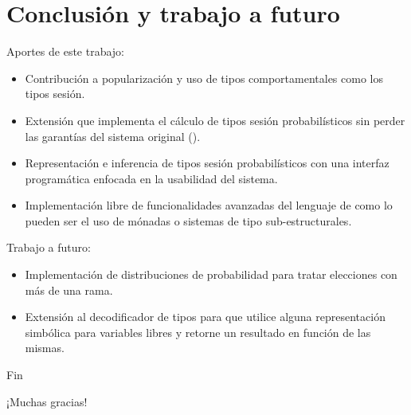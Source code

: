 \section{Conclusión y trabajo a futuro}
\begin{frame}{\insertsection}
	Aportes de este trabajo:
	\begin{itemize}
		\item Contribución a popularización y uso de tipos comportamentales como los
			tipos sesión.
		\item Extensión que implementa el cálculo de tipos sesión
			probabilísticos sin perder las garantías del sistema
			original (\FuSe).
		\item Representación e inferencia de tipos sesión
			probabilísticos con una interfaz programática enfocada
			en la usabilidad del sistema.
		\item Implementación libre de funcionalidades avanzadas del
			lenguaje de como lo pueden ser el uso de mónadas o
			sistemas de tipo sub-estructurales.
	\end{itemize}
\end{frame}

\begin{frame}{\insertsection}
	Trabajo a futuro:
	\begin{itemize}
		\item Implementación de distribuciones de probabilidad para
			tratar elecciones con más de una rama.
		\item Extensión al decodificador de tipos para que utilice
			alguna representación simbólica para variables libres y
			retorne un resultado en función de las mismas.
	\end{itemize}
\end{frame}

\begin{frame}{Fin}
	\begin{center}
	\Huge ¡Muchas gracias!
	\end{center}
\end{frame}
